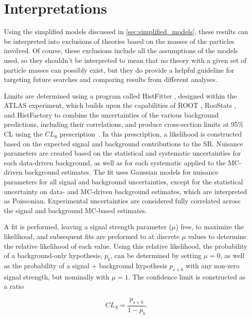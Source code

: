 
\chapter{Interpretations} %
\label{ch:interpretations} 

Using the simplified models discussed in \autoref{sec:simplified_models}, these results can be interpreted into exclusions of theories based on the masses of the particles involved. Of course, these exclusions include all the assumptions of the models used, so they shouldn't be interpreted to mean that no theory with a given set of particle masses can possibly exist, but they do provide a helpful guideline for targeting future searches and comparing results from different analyses.

Limits are determined using a program called HistFitter \cite{Baak:2014wma}, designed within the ATLAS experiment, which builds upon the capabilities of ROOT \cite{BRUN199781}, RooStats \cite{1009.1003}, and HistFactory \cite{Cranmer:2012sba} to combine the uncertainties of the various background predictions, including their correlations, and produce cross-section limits at 95\% \ac{CL} using the $CL_{\text{S}}$ prescription~\cite{statforumlimits,clsread}. In this prescription, a likelihood is constructed based on the expected signal and background contributions to the \ac{SR}. Nuisance parameters are created based on the statistical and systematic uncertainties for each data-driven background, as well as for each systematic applied to the \ac{MC}-driven background estimates. The fit uses Gaussian models for nuisance parameters for all signal and background uncertainties, except for the statistical uncertainty on data- and \ac{MC}-driven background estimates, which are interpreted as Poissonian. Experimental uncertainties are considered fully correlated across the signal and background \ac{MC}-based estimates. 

A fit is performed, leaving a signal strength parameter ($\mu$) free, to maximize the likelihood, and subsequent fits are preformed to at discrete $\mu$ values to determine the relative likelihood of each value. Using this relative likelihood, the probability of a background-only hypothesis, $p_b$, can be determined by setting $\mu=0$, as well as the probability of a signal + background hypothesis $p_{s+b}$ with any non-zero signal strength, but nominally with $\mu=1$. The confidence limit is constructed as a ratio

\begin{equation}
CL_S = \frac{p_{s+b}}{1-p_b}. 
\end{equation}


